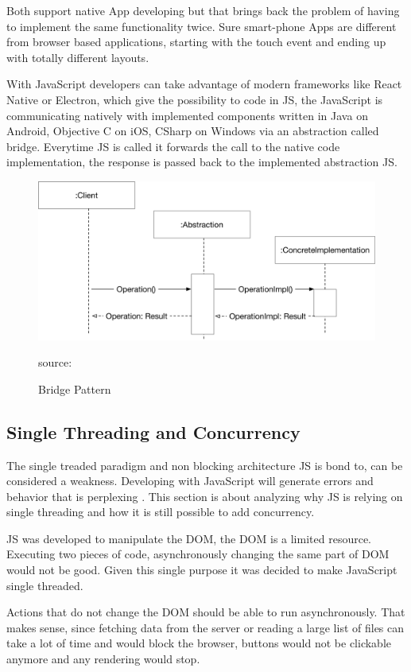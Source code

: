 Both support native App developing but that brings back the problem of having to implement the same functionality twice. Sure smart-phone Apps are different from browser based applications, starting with the touch event and ending up with totally different layouts. 

With JavaScript developers can take advantage of modern frameworks like React Native or Electron, which give the possibility to code in \gls{JS}, the JavaScript is communicating natively with implemented components written in Java on Android, Objective C on iOS, CSharp on Windows via an abstraction called bridge. Everytime \gls{JS} is called it forwards the call to the native code implementation, the response is passed back to the implemented abstraction \gls{JS}.

\begin{figure}[H]
	\centering
	\includegraphics[width=0.8\linewidth]{bilder/grundlagen/BridgePattern.png}
	\caption{Bridge Pattern} source:\cite{GOLL}
	\label{fig:BP}
\end{figure}


\subsection{Single Threading and Concurrency}
The single treaded paradigm and non blocking architecture \gls{JS} is bond to, can be considered a weakness. Developing with JavaScript will generate errors and behavior that is perplexing . This section is about analyzing why \gls{JS} is relying on single threading and how it is still possible to add concurrency.

\gls{JS} was developed to manipulate the DOM, the DOM is a limited resource. Executing two pieces of code, asynchronously changing the same part of DOM would not be good. Given this single purpose it was decided to make JavaScript single threaded.

Actions that do not change the DOM should be able to run asynchronously. That makes sense, since fetching data from the server or reading a large list of files can take a lot of time and would block the browser, buttons would not be clickable anymore and any rendering would stop. 

